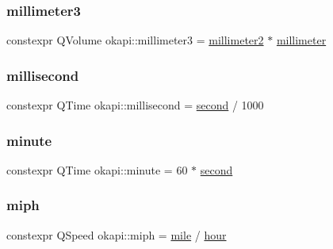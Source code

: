 \mbox{\label{namespaceokapi_a517d314801b2ffaeaeaa621d6be8cbdf}} 
\subsubsection{\texorpdfstring{millimeter3}{millimeter3}}
{\footnotesize\ttfamily constexpr Q\+Volume okapi\+::millimeter3 = \mbox{\hyperlink{namespaceokapi_a846f4e01f428ad9bff90f8dd7f7610d8}{millimeter2}} $\ast$ \mbox{\hyperlink{namespaceokapi_a9343219094a8231c1e3bc95505ba1227}{millimeter}}}

\mbox{\label{namespaceokapi_a2163ff1f012e1a2491d116bbeef79c71}} 
\subsubsection{\texorpdfstring{millisecond}{millisecond}}
{\footnotesize\ttfamily constexpr Q\+Time okapi\+::millisecond = \mbox{\hyperlink{namespaceokapi_ae9ece1daf9cd9f6d3a597cc5c0dc7b40}{second}} / 1000}

\mbox{\label{namespaceokapi_abce6256db60f015cf42c2b90cda699e3}} 
\subsubsection{\texorpdfstring{minute}{minute}}
{\footnotesize\ttfamily constexpr Q\+Time okapi\+::minute = 60 $\ast$ \mbox{\hyperlink{namespaceokapi_ae9ece1daf9cd9f6d3a597cc5c0dc7b40}{second}}}

\mbox{\label{namespaceokapi_aa2bafeb1e615f437ffe7b2aca205e59c}} 
\subsubsection{\texorpdfstring{miph}{miph}}
{\footnotesize\ttfamily constexpr Q\+Speed okapi\+::miph = \mbox{\hyperlink{namespaceokapi_adb797d6d549d23e9b2e6c817a07ddfba}{mile}} / \mbox{\hyperlink{namespaceokapi_a43d321d318cb594798b60a6be26e85ce}{hour}}}

\mbox{\label{namespaceokapi_afecc245ceeabbbfe9f0e6f37fcb2d634}} 
